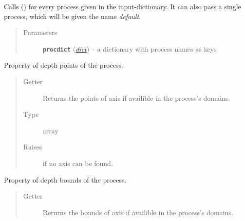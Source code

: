 \documentclass[a4paper,10pt,english]{sphinxmanual}
\begin{document}
\begin{fulllineitems}
\begin{fulllineitems}
Calls {\hyperref[api/climlab.process:climlab.process.process.Process.add_subprocess]{\emph{}}} () for every process given in the 
input-dictionary. It can also pass a single process, which will 
be given the name \emph{default}.
\begin{quote}\begin{description}
\item[{Parameters}] \leavevmode
\textbf{\texttt{procdict}} (\href{http://docs.python.org/2.7/library/stdtypes.html\#dict}{\emph{dict}}) -- a dictionary with process names as keys

\end{description}\end{quote}

\end{fulllineitems}


\begin{fulllineitems}
\label{api/climlab.process:climlab.process.process.Process.depth}
Property of depth points of the process.
\begin{quote}\begin{description}
\item[{Getter}] \leavevmode
Returns the points of axis  if availible in the
process's domains.

\item[{Type}] \leavevmode
array

\item[{Raises}] \leavevmode
{}
if no  axis can be found.

\end{description}\end{quote}

\end{fulllineitems}


\begin{fulllineitems}
\label{api/climlab.process:climlab.process.process.Process.depth_bounds}
Property of depth bounds of the process.
\begin{quote}\begin{description}
\item[{Getter}] \leavevmode
Returns the bounds of axis  if availible in the
process's domains.


\end{description}
\end{quote}
\end{fulllineitems}
\end{fulllineitems}
\end{document}
